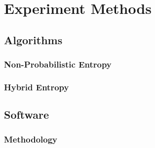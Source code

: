 \chapter{Experiment Methods}





\section{Algorithms}

\subsection{Non-Probabilistic Entropy}

\subsection{Hybrid Entropy}

\section{Software}

\subsection{Methodology}

